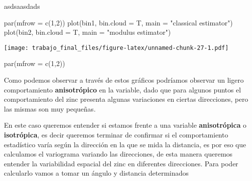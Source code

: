 \documentclass[
  12pt,
]{article}
\newenvironment{Shaded}{\begin{snugshade}}{\end{snugshade}}
\newcommand{\AttributeTok}[1]{\textcolor[rgb]{0.77,0.63,0.00}{#1}}
\newcommand{\DecValTok}[1]{\textcolor[rgb]{0.00,0.00,0.81}{#1}}
\newcommand{\FloatTok}[1]{\textcolor[rgb]{0.00,0.00,0.81}{#1}}
\newcommand{\FunctionTok}[1]{\textcolor[rgb]{0.00,0.00,0.00}{#1}}
\newcommand{\NormalTok}[1]{#1}
\newcommand{\OtherTok}[1]{\textcolor[rgb]{0.56,0.35,0.01}{#1}}
\newcommand{\SpecialCharTok}[1]{\textcolor[rgb]{0.00,0.00,0.00}{#1}}
\newcommand{\StringTok}[1]{\textcolor[rgb]{0.31,0.60,0.02}{#1}}
\begin{document}
asdsaasdads

\begin{Shaded}
\begin{Highlighting}[]
\FunctionTok{par}\NormalTok{(}\AttributeTok{mfrow =} \FunctionTok{c}\NormalTok{(}\DecValTok{1}\NormalTok{,}\DecValTok{2}\NormalTok{))}
\FunctionTok{plot}\NormalTok{(bin1, }\AttributeTok{bin.cloud =}\NormalTok{ T, }\AttributeTok{main =} \StringTok{"classical estimator"}\NormalTok{)}
\FunctionTok{plot}\NormalTok{(bin2, }\AttributeTok{bin.cloud =}\NormalTok{ T, }\AttributeTok{main =} \StringTok{"modulus estimator"}\NormalTok{)}
\end{Highlighting}
\end{Shaded}

\texttt{[image: trabajo\_final\_files/figure-latex/unnamed-chunk-27-1.pdf]}

\begin{Shaded}
\begin{Highlighting}[]
\FunctionTok{par}\NormalTok{(}\AttributeTok{mfrow =} \FunctionTok{c}\NormalTok{(}\DecValTok{1}\NormalTok{,}\DecValTok{2}\NormalTok{))}
\end{Highlighting}
\end{Shaded}

Como podemos observar a través de estos gráficos podríamos observar un
ligero comportamiento \textbf{anisotrópico} en la variable, dado que
para algunos puntos el comportamiento del zinc presenta algunas
variaciones en ciertas direcciones, pero las mismas son muy pequeñas.

En este caso queremos entender si estamos frente a una variable
\textbf{anisotrópica} o \textbf{isotrópica}, es decir queremos terminar
de confirmar si el comportamiento estadístico varía según la dirección
en la que se mida la distancia, es por eso que calculamos el variograma
variando las direcciones, de esta manera queremos entender la
variabilidad espacial del zinc en diferentes direcciones. Para poder
calcularlo vamos a tomar un ángulo y distancia determinados

\begin{Shaded}
\end{Shaded}
\end{document}
